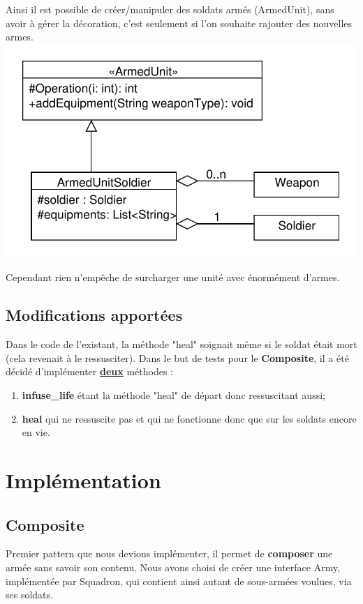 \documentclass[12pt]{article}
\begin{document}
\begin{enumerate}
Ainsi il est possible de créer/manipuler des soldats armés (ArmedUnit),
sans avoir à gérer la décoration, c'est seulement si l'on souhaite rajouter des nouvelles armes.
\includegraphics[scale=1]{../UML/Proxy}

Cependant rien n'empêche de surcharger une unité avec énormément d'armes.
\end{enumerate}
\subsection{Modifications apportées}
Dans le code de l'existant, la méthode "heal" soignait même si le soldat était mort (cela revenait à le ressusciter).
Dans le but de tests pour le \textbf{Composite}, il a été décidé d'implémenter \underline{\textbf{deux}} méthodes :
\begin{enumerate}
 \item \textbf{infuse\_life} étant la méthode "heal" de départ donc ressuscitant aussi;
 \item \textbf{heal} qui ne ressuscite pas et qui ne fonctionne donc que sur les soldats encore en vie.
\end{enumerate}

\newpage
\section{Implémentation}
\subsection{Composite}
Premier pattern que nous devions implémenter, il permet de \textbf{composer} une armée sans savoir son contenu.
Nous avons choisi de créer une interface Army, implémentée par Squadron, qui contient ainsi autant de sous-armées voulues, via ses soldats.
\end{document}
